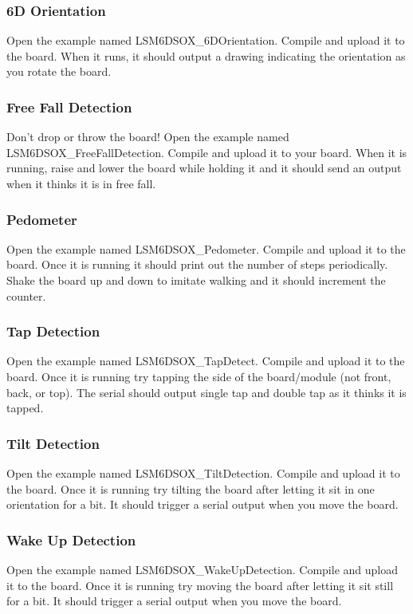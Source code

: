 \subsubsection{6D Orientation}
Open the example named LSM6DSOX\_6DOrientation. Compile and upload it to the board. When it
runs, it should output a drawing indicating the orientation as you rotate the board.

\subsubsection{Free Fall Detection}
Don't drop or throw the board! Open the example named LSM6DSOX\_FreeFallDetection. Compile 
and upload it to your board. When it is running, raise and lower the board while holding it 
and it should send an output when it thinks it is in free fall. 

\subsubsection{Pedometer}
Open the example named LSM6DSOX\_Pedometer. Compile and upload it to the board. Once it is 
running it should print out the number of steps periodically. Shake the board up and down 
to imitate walking and it should increment the counter.

\subsubsection{Tap Detection}
Open the example named LSM6DSOX\_TapDetect. Compile and upload it to the board. Once it is 
running try tapping the side of the board/module (not front, back, or top). The serial should 
output single tap and double tap as it thinks it is tapped.

\subsubsection{Tilt Detection}
Open the example named LSM6DSOX\_TiltDetection. Compile and upload it to the board. Once it is 
running try tilting the board after letting it sit in one orientation for a bit. It should 
trigger a serial output when you move the board.

\subsubsection{Wake Up Detection}
Open the example named LSM6DSOX\_WakeUpDetection. Compile and upload it to the board. Once it is 
running try moving the board after letting it sit still for a bit. It should trigger a serial 
output when you move the board.

